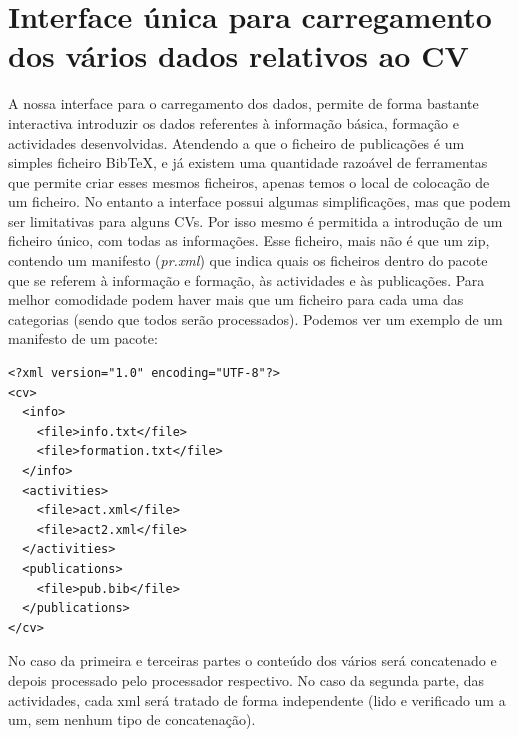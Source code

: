 \documentclass[a4paper,11pt,openright,openbib]{article}
\begin{document}
\section{Interface única para carregamento dos vários dados relativos ao CV}
A nossa interface para o carregamento dos dados, permite de forma bastante interactiva introduzir os dados referentes à informação básica, formação e actividades desenvolvidas. Atendendo a que o ficheiro de publicações é um simples ficheiro BibTeX, e já existem uma quantidade razoável de ferramentas que permite criar esses mesmos ficheiros, apenas temos o local de colocação de um ficheiro. No entanto a interface possui algumas simplificações, mas que podem ser limitativas para alguns CVs. Por isso mesmo é permitida a introdução de um ficheiro único, com todas as informações. Esse ficheiro, mais não é que um zip, contendo um manifesto (\emph{pr.xml}) que indica quais os ficheiros dentro do pacote que se referem à informação e formação, às actividades e às publicações. Para melhor comodidade podem haver mais que um ficheiro para cada uma das categorias (sendo que todos serão processados). Podemos ver um exemplo de um manifesto de um pacote:
\begin{verbatim}
<?xml version="1.0" encoding="UTF-8"?>
<cv>
  <info>
    <file>info.txt</file>
    <file>formation.txt</file>
  </info>
  <activities>
    <file>act.xml</file>
    <file>act2.xml</file>
  </activities>
  <publications>
    <file>pub.bib</file>
  </publications>
</cv>
\end{verbatim}
No caso da primeira e terceiras partes o conteúdo dos vários será concatenado e depois processado pelo processador respectivo. No caso da segunda parte, das actividades, cada xml será tratado de forma independente (lido e verificado um a um, sem nenhum tipo de concatenação).\\
\end{document}
